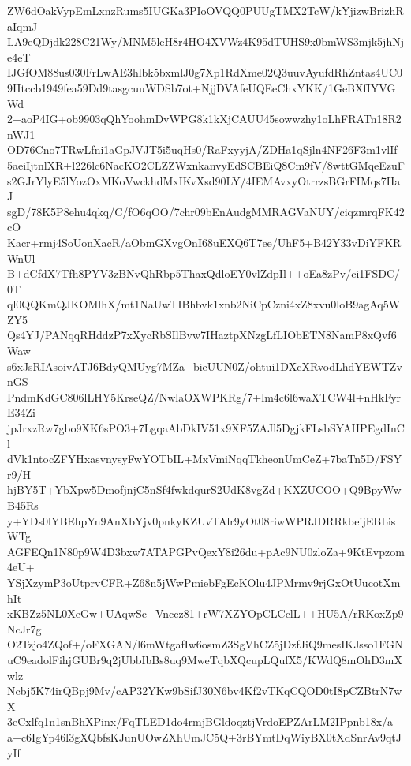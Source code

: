 ZW6dOakVypEmLxnzRums5IUGKa3PIoOVQQ0PUUgTMX2TcW/kYjizwBrizhRaIqmJ
LA9eQDjdk228C21Wy/MNM5leH8r4HO4XVWz4K95dTUHS9x0bmWS3mjk5jhNje4eT
IJGfOM88us030FrLwAE3hlbk5bxmlJ0g7Xp1RdXme02Q3uuvAyufdRhZntas4UC0
9Htccb1949fea59Dd9tasgcuuWDSb7ot+NjjDVAfeUQEeChxYKK/1GeBXfIYVGWd
2+aoP4IG+ob9903qQhYoohmDvWPG8k1kXjCAUU45sowwzhy1oLhFRATn18R2nWJ1
OD76Cno7TRwLfni1aGpJVJT5i5uqHs0/RaFxyyjA/ZDHa1qSjln4NF26F3m1vlIf
5aeiIjtnlXR+l226lc6NacKO2CLZZWxnkanvyEdSCBEiQ8Cm9fV/8wttGMqeEzuF
s2GJrYlyE5lYozOxMKoVwckhdMxIKvXsd90LY/4IEMAvxyOtrrzsBGrFIMqs7HaJ
sgD/78K5P8ehu4qkq/C/fO6qOO/7chr09bEnAudgMMRAGVaNUY/ciqzmrqFK42cO
Kacr+rmj4SoUonXacR/aObmGXvgOnI68uEXQ6T7ee/UhF5+B42Y33vDiYFKRWnUl
B+dCfdX7Tfh8PYV3zBNvQhRbp5ThaxQdloEY0vlZdpIl++oEa8zPv/ci1FSDC/0T
ql0QQKmQJKOMlhX/mt1NaUwTIBhbvk1xnb2NiCpCzni4xZ8xvu0loB9agAq5WZY5
Qs4YJ/PANqqRHddzP7xXycRbSIlBvw7IHaztpXNzgLfLIObETN8NamP8xQvf6Waw
s6xJsRIAsoivATJ6BdyQMUyg7MZa+bieUUN0Z/ohtui1DXcXRvodLhdYEWTZvnGS
PndmKdGC806lLHY5KrseQZ/NwlaOXWPKRg/7+lm4c6l6waXTCW4l+nHkFyrE34Zi
jpJrxzRw7gbo9XK6sPO3+7LgqaAbDkIV51x9XF5ZAJl5DgjkFLsbSYAHPEgdInCl
dVk1ntocZFYHxasvnysyFwYOTbIL+MxVmiNqqTkheonUmCeZ+7baTn5D/FSYr9/H
hjBY5T+YbXpw5DmofjnjC5nSf4fwkdqurS2UdK8vgZd+KXZUCOO+Q9BpyWwB45Rs
y+YDs0lYBEhpYn9AnXbYjv0pnkyKZUvTAlr9yOt08riwWPRJDRRkbeijEBLisWTg
AGFEQn1N80p9W4D3bxw7ATAPGPvQexY8i26du+pAc9NU0zloZa+9KtEvpzom4eU+
YSjXzymP3oUtprvCFR+Z68n5jWwPmiebFgEcKOlu4JPMrmv9rjGxOtUucotXmhIt
xKBZz5NL0XeGw+UAqwSc+Vnccz81+rW7XZYOpCLCclL++HU5A/rRKoxZp9NcJr7g
O2Tzjo4ZQof+/oFXGAN/l6mWtgafIw6osmZ3SgVhCZ5jDzfJiQ9mesIKJsso1FGN
uC9eadolFihjGUBr9q2jUbbIbBs8uq9MweTqbXQcupLQufX5/KWdQ8mOhD3mXwlz
Ncbj5K74irQBpj9Mv/cAP32YKw9bSifJ30N6bv4Kf2vTKqCQOD0tI8pCZBtrN7wX
3eCxlfq1n1snBhXPinx/FqTLED1do4rmjBGldoqztjVrdoEPZArLM2IPpnb18x/a
a+c6IgYp46l3gXQbfsKJunUOwZXhUmJC5Q+3rBYmtDqWiyBX0tXdSnrAv9qtJyIf
